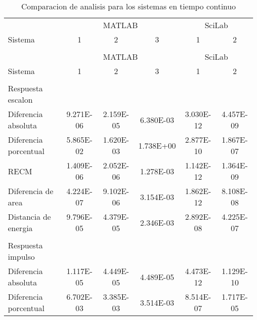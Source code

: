         {\setlength\LTleft{0pt}
        \setlength\LTright{0pt}
        \scriptsize
        \centering
        \renewcommand{\arraystretch}{0.89}
        \begin{longtable}{l @{\extracolsep{\fill}} ccccc}
        \caption[Comparacion de analisis - tiempo continuo]{Comparacion de analisis para los sistemas en tiempo continuo} \label{tab:AnalisisStepC} \\
        \toprule
        &    \multicolumn{3}{c}{MATLAB}     & \multicolumn{2}{c}{SciLab} \\ \cmidrule{2-4}\cmidrule{5-6}
        Sistema 					 & 1               &     2      & 3  & 1  & 2 \\ 
        & & & & & \\
        \endfirsthead
        \toprule
        &    \multicolumn{3}{c}{MATLAB}     & \multicolumn{2}{c}{SciLab} \\ \cmidrule{2-4}\cmidrule{5-6}
        Sistema 					 & 1               &     2      & 3  & 1  & 2 \\ 
        & & & & & \\
        \endhead
            Respuesta escalon  &  &  &  &  &  \\ \cmidrule{1-1}
            Diferencia absoluta          & \num{9.271E-06} & \num{2.159E-05} & \num{6.380E-03} & \num{3.030E-12} & \num{4.457E-09}  \\
            Diferencia porcentual        & \num{5.865E-02} & \num{1.620E-03} & \num{1.738E+00} & \num{2.877E-10} & \num{1.867E-07}  \\
            RECM                         & \num{1.409E-06} & \num{2.052E-06} & \num{1.278E-03} & \num{1.142E-12} & \num{1.364E-09}  \\
            Diferencia de area           & \num{4.224E-07} & \num{9.102E-06} & \num{3.154E-03} & \num{1.862E-12} & \num{8.108E-08}  \\
            Distancia de energia         & \num{9.796E-05} & \num{4.379E-05} & \num{2.346E-03} & \num{2.892E-08} & \num{4.225E-07}  \\
            & & & & & \\
            Respuesta impulso &  &  &  &  &  \\ \cmidrule{1-1}
            Diferencia absoluta          & \num{1.117E-05} & \num{4.449E-05} & \num{4.489E-05} & \num{4.473E-12} & \num{1.129E-10}  \\
            Diferencia porcentual        & \num{6.702E-03} & \num{3.385E-03} & \num{3.514E-03} & \num{8.514E-07} & \num{1.717E-05}  \\

\end{longtable}}
